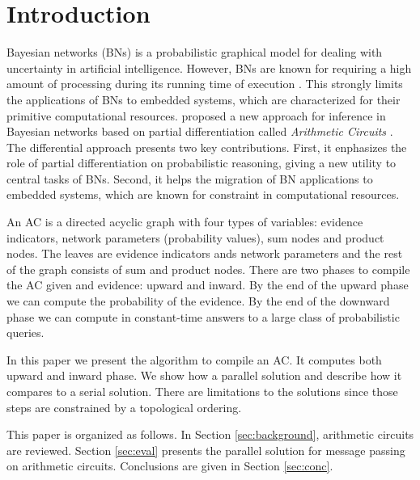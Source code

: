 \documentclass[twoside,11pt]{article}
\begin{document}
\section{Introduction}
\label{sec:intro}


Bayesian networks (BNs) \citep{pear88} is a probabilistic graphical model for dealing with uncertainty in artificial intelligence.
However, BNs are known for requiring a high amount of processing during its running time of execution \citep{koll09}.
This strongly limits the applications of BNs to embedded systems, which are characterized for their primitive computational resources. 
\cite{darwiche00} proposed a new approach for inference in Bayesian networks based on partial differentiation called \emph{Arithmetic Circuits} \citep{darwiche00}.
The differential approach presents two key contributions.
First, it enphasizes the role of partial differentiation on probabilistic reasoning, giving a new utility to central tasks of BNs.
Second, it helps the migration of BN applications to embedded systems, which are known for constraint in computational resources.

An AC is a directed acyclic graph with four types of variables: evidence indicators, network parameters (probability values), sum nodes and product nodes.
The leaves are evidence indicators ands network parameters and the rest of the graph consists of sum and product nodes.
There are two phases to compile the AC given and evidence: upward and inward.
By the end of the upward phase we can compute the probability of the evidence.
By the end of the downward phase we can compute in constant-time answers to a large class of probabilistic queries.

In this paper we present the algorithm to compile an AC.
It computes both upward and inward phase.
We show how a parallel solution and describe how it compares to a serial solution.
There are limitations to the solutions since those steps are constrained by a topological ordering.

This paper is organized as follows.
In Section \ref{sec:background}, arithmetic circuits are reviewed.
Section \ref{sec:eval} presents the parallel solution for message passing on arithmetic circuits.
Conclusions are given in Section \ref{sec:conc}.
\end{document}
